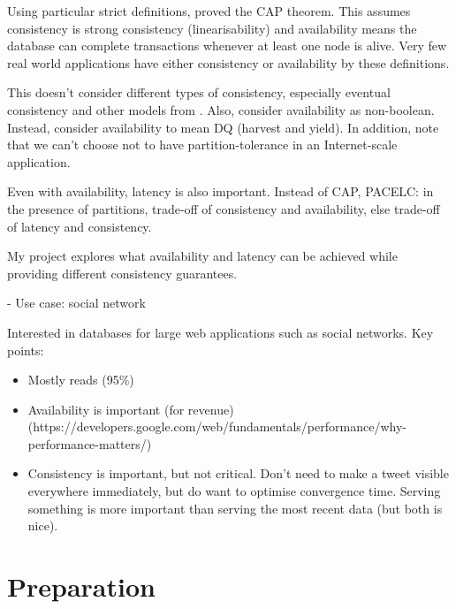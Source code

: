\documentclass[12pt,a4paper,twoside,openright]{report}
\begin{document}
Using particular strict definitions, \cite{gilbert} proved the CAP theorem. This assumes consistency is strong consistency (linearisability) and availability means the database can complete transactions whenever at least one node is alive. Very few real world applications have either consistency or availability by these definitions.

This doesn't consider different types of consistency, especially eventual consistency and other models from \cite{terry2013}. Also, consider availability as non-boolean. Instead, consider availability to mean DQ (harvest and yield). In addition, note that we can't choose not to have partition-tolerance in an Internet-scale application. \cite{hale_2010}

Even with availability, latency is also important. Instead of CAP, PACELC: in the presence of partitions, trade-off of consistency and availability, else trade-off of latency and consistency. \cite{abadi2012consistency}

My project explores what availability and latency can be achieved while providing different consistency guarantees.

- Use case: social network

Interested in databases for large web applications such as social networks. Key points:

\begin{itemize}
\item
Mostly reads (95\%) \cite{nunemaker}

\item
Availability is important (for revenue) (https://developers.google.com/web/fundamentals/performance/why-performance-matters/)

\item
Consistency is important, but not critical. Don't need to make a tweet visible everywhere immediately, but do want to optimise convergence time. Serving something is more important than serving the most recent data (but both is nice).

\end{itemize}

\chapter{Preparation}


\end{document}
